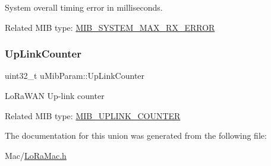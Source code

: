 System overall timing error in milliseconds.

Related M\+IB type\+: \hyperlink{group__LORAMAC_gga32ea83d13a3f5bb4b3ec2ace2319ab61ad5d382841f32fba944bdb68b25699e45}{M\+I\+B\+\_\+\+S\+Y\+S\+T\+E\+M\+\_\+\+M\+A\+X\+\_\+\+R\+X\+\_\+\+E\+R\+R\+OR} \mbox{\label{unionuMibParam_a832b6a7ceb162e04422c74ef84828359}} 
\subsubsection{\texorpdfstring{Up\+Link\+Counter}{UpLinkCounter}}
{\footnotesize\ttfamily uint32\+\_\+t u\+Mib\+Param\+::\+Up\+Link\+Counter}

Lo\+Ra\+W\+AN Up-\/link counter

Related M\+IB type\+: \hyperlink{group__LORAMAC_gga32ea83d13a3f5bb4b3ec2ace2319ab61ad0d2e0023858ce3fab3647fa97428d84}{M\+I\+B\+\_\+\+U\+P\+L\+I\+N\+K\+\_\+\+C\+O\+U\+N\+T\+ER} 

The documentation for this union was generated from the following file\+:\begin{DoxyCompactItemize}
\item 
Mac/\hyperlink{LoRaMac_8h}{Lo\+Ra\+Mac.\+h}\end{DoxyCompactItemize}

